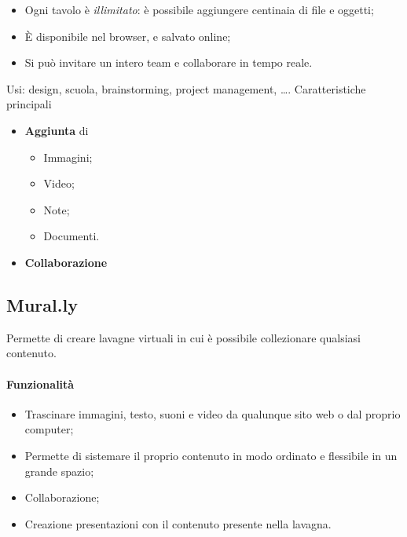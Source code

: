 \begin{itemize}
\item Ogni tavolo è \emph{illimitato}: è possibile aggiungere centinaia di file e oggetti;
\item \`E disponibile nel browser, e salvato online;
\item Si può invitare un intero team e collaborare in tempo reale.
\end{itemize}
Usi: design, scuola, brainstorming, project management, \dots.
Caratteristiche principali
\begin{itemize}
 \item \textbf{Aggiunta} di
 \begin{itemize}
  \item Immagini;
  \item Video;
  \item Note;
  \item Documenti.
 \end{itemize}
 \item \textbf{Collaborazione}
\end{itemize}
\subsection{Mural.ly}
Permette di creare lavagne virtuali in cui è possibile collezionare qualsiasi contenuto. 

\paragraph{Funzionalità}
\begin{itemize}
\item Trascinare immagini, testo, suoni e video da qualunque sito web o dal proprio computer;
\item Permette di sistemare il proprio contenuto in modo ordinato e flessibile in un grande spazio;
\item Collaborazione;
\item Creazione presentazioni con il contenuto presente nella lavagna.
\end{itemize}

